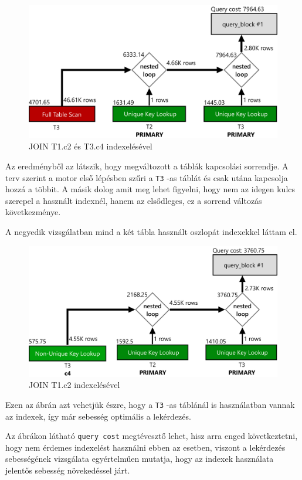 \begin{figure}[h!]
\centering
\includegraphics[width=14cm]{images/explain/3-2.png}
\caption{JOIN T1.c2 és T3.c4 indexelésével}
\label{fig:schema}
\end{figure}
Az eredményből az látszik, hogy megváltozott a táblák kapcsolási sorrendje. A terv szerint a motor első lépésben szűri a \texttt{T3} -as táblát és csak utána kapcsolja hozzá a többit. A másik dolog amit meg lehet figyelni, hogy nem az idegen kulcs szerepel a használt indexnél, hanem az elsődleges, ez a sorrend változás következménye.

A negyedik vizsgálatban mind a két tábla használt oszlopát indexekkel láttam el.
\begin{figure}[h!]
\centering
\includegraphics[width=14cm]{images/explain/3-3.png}
\caption{JOIN T1.c2 indexelésével}
\label{fig:schema}
\end{figure}
Ezen az ábrán azt vehetjük észre, hogy a \texttt{T3} -as táblánál is használatban vannak az indexek, így már sebesség optimális a lekérdezés.

Az ábrákon látható \texttt{query cost} megtévesztő lehet, hisz arra enged következtetni, hogy nem érdemes indexelést használni ebben az esetben, viszont a lekérdezés sebességének vizsgálata egyértelműen mutatja, hogy az indexek használata jelentős sebesség növekedéssel járt. 
